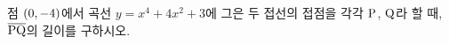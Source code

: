 점 $(0{,}\mkern3mu\mathopen{}-4)$에서 곡선 $y=x^4+4x^2+3$에 그은 두 접선의 접점을 각각 $\mathrm{P}$, $\mathrm{Q}$라 할 때, $\overline{\mathrm{PQ}}$의 길이를 구하시오.
